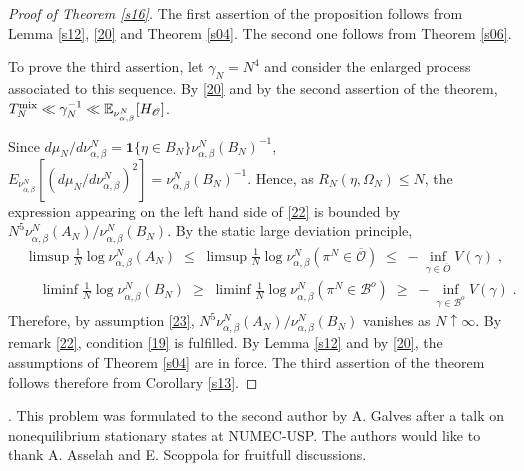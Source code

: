 \documentclass[reqno]{amsart}
\begin{document}
\begin{proof}[Proof of Theorem \ref{s16}]
The first assertion of the proposition follows from Lemma \ref{s12},
\eqref{20} and Theorem \ref{s04}. The second one follows from Theorem
\ref{s06}.

To prove the third assertion, let $\gamma_N = N^4$ and consider the
enlarged process associated to this sequence. By \eqref{20} and by the
second assertion of the theorem, $T^{\rm mix}_N \ll \gamma^{-1}_N \ll
{{\mathbb E}}_{\nu^N_{\alpha, \beta}} [H_{{{\mathscr O}}}]$. 

Since $d\mu_N/d\nu^N_{\alpha, \beta} = {{\mathbf 1}}\{\eta\in B_N\}
\nu^N_{\alpha, \beta} (B_N)^{-1}$, $E_{\nu^N_{\alpha, \beta}} [
(d\mu_N/d\nu^N_{\alpha, \beta})^2] = \nu^N_{\alpha,
  \beta}(B_N)^{-1}$. Hence, as $R_N(\eta,\Omega_N) \le N$, the
expression appearing on the left hand side of \eqref{22} is bounded by
$N^5 \nu^N_{\alpha, \beta}(A_N) /\nu^N_{\alpha, \beta}(B_N)$. By
the static large deviation principle,
\begin{equation*}
\begin{split}
& \limsup \frac 1N \log \nu^N_{\alpha, \beta} (A_N) \;\le \;
\limsup \frac 1N \log \nu^N_{\alpha, \beta} (\pi^N \in
\overline{{{\mathscr O}}}) \;\le\; - \inf_{\gamma \in \overline{O}} V(\gamma)
\; , \\
& \quad \liminf \frac 1N \log \nu^N_{\alpha, \beta} (B_N) \;\ge \;
\liminf \frac 1N \log \nu^N_{\alpha, \beta} (\pi^N \in
{{\mathscr B}}^o) \;\ge\; - \inf_{\gamma \in {{\mathscr B}}^o} V(\gamma)\;.
\end{split}
\end{equation*}
Therefore, by assumption \eqref{23}, $N^5 \nu^N_{\alpha, \beta}(A_N)
/\nu^N_{\alpha, \beta}(B_N)$ vanishes as $N\uparrow\infty$. By remark
\eqref{22}, condition \eqref{19} is fulfilled. By Lemma \ref{s12} and
by \eqref{20}, the assumptions of Theorem \ref{s04} are in force. The
third assertion of the theorem follows therefore from Corollary
\ref{s13}.
\end{proof}

\smallskip{}. This problem was formulated
to the second author by A. Galves after a talk on nonequilibrium
stationary states at NUMEC-USP.  The authors would like to thank
A. Asselah and E. Scoppola for fruitfull discussions.
\end{document}
